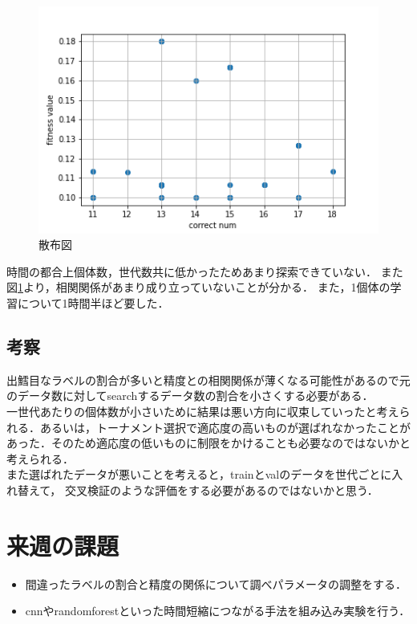 \documentclass[twocolumn]{jarticle}     %
\begin{document}
\begin{figure}[h]
	\begin{center}
		\centering
		\includegraphics[scale=0.5]{img.png}
		\caption{散布図\label{fig}}
	\end{center}
\end{figure}

時間の都合上個体数，世代数共に低かったためあまり探索できていない．
また図\ref{fig}より，相関関係があまり成り立っていないことが分かる．
また，1個体の学習について1時間半ほど要した．

\subsection{考察}
出鱈目なラベルの割合が多いと精度との相関関係が薄くなる可能性があるので元のデータ数に対してsearchするデータ数の割合を小さくする必要がある．\\
一世代あたりの個体数が小さいために結果は悪い方向に収束していったと考えられる．あるいは，トーナメント選択で適応度の高いものが選ばれなかったことがあった．そのため適応度の低いものに制限をかけることも必要なのではないかと考えられる．\\
また選ばれたデータが悪いことを考えると，trainとvalのデータを世代ごとに入れ替えて，
交叉検証のような評価をする必要があるのではないかと思う．

\section{来週の課題}
\begin{itemize}
	\item 間違ったラベルの割合と精度の関係について調べパラメータの調整をする．
	\item cnnやrandomforestといった時間短縮につながる手法を組み込み実験を行う．
\end{itemize}
\end{document}
